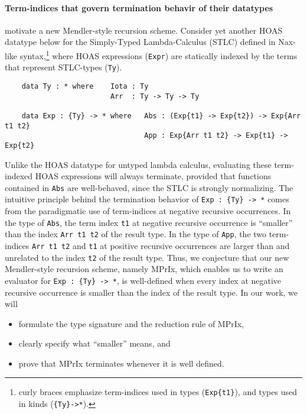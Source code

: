 \documentclass[a4paper]{easychair} %
\begin{document}
\paragraph{Term-indices that govern termination behavir of their datatypes\!\!}
motivate a new Mendler-style recursion scheme.
Consider yet another HOAS datatype below for the Simply-Typed Lambda-Calculus (STLC)
defined in Nax-like syntax,\footnote{curly braces emphasize
  term-indices used in types (\texttt{Exp\{t1\}}),
  and types used in kinds (\texttt{\{Ty\}\;->\;*}).}
where HOAS expressions (\texttt{Expr}) are
statically indexed by the terms that represent STLC-types (\texttt{Ty}).
\begin{verbatim}
    data Ty : * where    Iota : Ty
                         Arr  : Ty -> Ty -> Ty

    data Exp : {Ty} -> * where   Abs : (Exp{t1} -> Exp{t2}) -> Exp{Arr t1 t2}
                                 App : Exp{Arr t1 t2} -> Exp{t1} -> Exp{t2}
\end{verbatim}
Unlike the HOAS datatype for untyped lambda calculus, evaluating
these term-indexed HOAS expressions will always terminate,
provided that functions contained in \texttt{Abs} are well-behaved,
since the STLC is strongly normalizing.
The intuitive principle behind the termination behavior of \texttt{Exp\,:\,\{Ty\}\,->\,*}
comes from the paradigmatic use of term-indices at negative recursive occurrences.  
In the type of \texttt{Abs}, the term index \texttt{t1}
at negative recursive occurrence is ``smaller'' than the index
\texttt{Arr t1 t2} of the result type. In the type of \texttt{App},
the two term-indices \texttt{Arr t1 t2} and \texttt{t1} at positive recursive
occurrences are larger than and unrelated to the index \texttt{t2} of the result type.
Thus, we conjecture that our new Mendler-style recursion scheme, namely \textsf{MPrIx},
which enables us to write an evaluator for  \texttt{Exp\,:\,\{Ty\}\,->\,*}, 
is well-defined when every index at negative recursive occurrence is
smaller than the index of the result type.
In our work, we will \vspace*{-1ex}
\begin{itemize}
 \item formulate the type signature and the reduction rule of \textsf{MPrIx},
 \vspace*{-1ex}
 \item clearly specify what ``smaller'' means, and
 \vspace*{-1ex}
 \item prove that \textsf{MPrIx} terminates whenever it is well defined.
\end{itemize}
\end{document}

